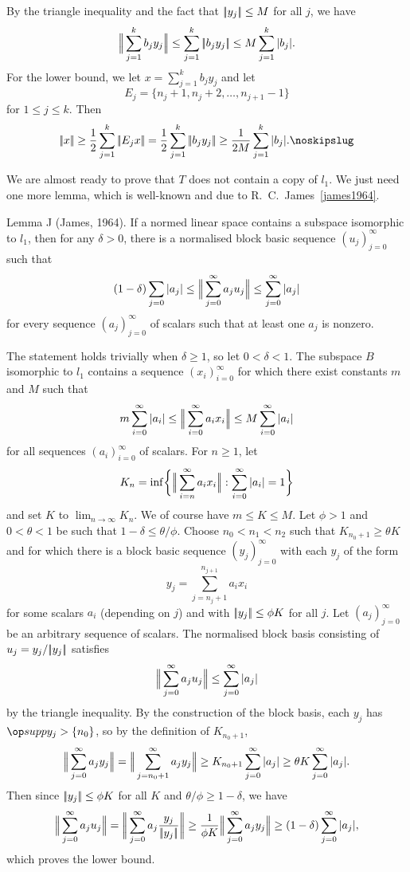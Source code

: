 \proof By the triangle inequality and the fact that $|\!|y_j|\!| \le M$ for all $j$, we have
$$\Big|\!\Big|\sum_{j=1}^k b_jy_j\Big|\!\Big| \le \sum_{j=1}^k |\!|b_jy_j|\!| \le  M\sum_{j=1}^k |b_j|.$$
For the lower bound, we let $x = \sum_{j=1}^k b_jy_j$ and let
$$E_j = \{n_j+1, n_j+2, \ldots, n_{j+1}-1\}$$
for $1\le j\le k$. Then
$$\norm x \ge {1\over 2}\sum_{j=1}^k \norm{E_j x} = {1\over 2}\sum_{j=1}^k \norm{b_j y_j}
  \ge {1\over 2M}\sum_{j=1}^k |b_j|.\noskipslug$$

We are almost ready to prove that $T$ does not contain a copy of $l_1$. We just need one more lemma,
which is well-known and due to R.~C.~James~\ref{james1964}.

\parenproclaim Lemma J (James, {\rm 1964}). If a normed linear space contains a subspace isomorphic
to $l_1$, then for any $\delta>0$, there is a normalised block basic sequence $(u_j)_{j=0}^\infty$ such that
$$(1-\delta)\sum_{j=0} |a_j| \le \Big|\!\Big|\sum_{j=0}^\infty a_ju_j\Big|\!\Big| \le \sum_{j=0}^\infty |a_j|$$
for every sequence $(a_j)_{j=0}^\infty$ of scalars such that at least one $a_j$ is nonzero.

\proof The statement holds trivially when $\delta\ge 1$, so let $0<\delta<1$.
The subspace $B$ isomorphic to $l_1$ contains a sequence $(x_i)_{i=0}^\infty$ for which there
exist constants $m$ and $M$ such that
$$ m\sum_{i=0}^\infty |a_i| \le \Big|\!\Big|\sum_{i=0}^\infty a_i x_i\Big|\!\Big| \le M\sum_{i=0}^\infty |a_i|$$
for all sequences $(a_i)_{i=0}^\infty$ of scalars. For $n\ge 1$, let
$$ K_n = \inf \biggl\{ \Big|\!\Big| \sum_{i=n}^\infty a_ix_i \Big|\!\Big| : \sum_{i=0}^\infty |a_i| = 1\biggr\} $$
and set $K$ to $\lim_{n\to \infty} K_n$. We of course have $m\le K\le M$. Let $\phi >1$ and $0<\theta<1$
be such that $1-\delta \le \theta/\phi$. Choose $n_0<n_1<n_2$ such that $K_{n_0+1} \ge \theta K$ and for which
there is a block
basic sequence $(y_j)_{j=0}^\infty$ with each $y_j$ of the form
$$ y_j = \sum_{j=n_j+1}^{n_{j+1}} a_i x_i $$
for some scalars $a_i$ (depending on $j$) and with $|\!|y_j|\!| \le \phi K$ for all $j$.
Let $(a_j)_{j=0}^\infty$ be an arbitrary sequence of scalars.
The normalised
block basis consisting of $u_j = y_j/|\!|y_j|\!|$ satisfies
$$\Big|\!\Big|\sum_{j=0}^\infty a_ju_j\Big|\!\Big| \le \sum_{j=0}^\infty |a_j|$$
by the triangle inequality. By the construction of the block basis,
each $y_j$ has $\supp y_j > \{n_0\}$, so by the definition of $K_{n_0+1}$,
$$\Big|\!\Big|\sum_{j=0}^\infty a_jy_j\Big|\!\Big| = \Big|\!\Big|\sum_{j=n_0+1}^\infty a_jy_j\Big|\!\Big| \ge K_{n_0+1} \sum_{j=0}^\infty |a_j|
\ge \theta K \sum_{j=0}^\infty |a_j|.$$
Then since $|\!|y_j|\!| \le \phi K$ for all $K$ and $\theta/\phi \ge 1-\delta$, we have
$$\Norm{\sum_{j=0}^\infty a_j u_j} = \normm{\sum_{j=0}^\infty a_j {y_j\over \norm{y_j}}}
\ge {1\over \phi K} \Norm{\sum_{j=0}^\infty a_j y_j} \ge (1-\delta)\sum_{j=0}^\infty |a_j|,$$
which proves the lower bound.\slug

